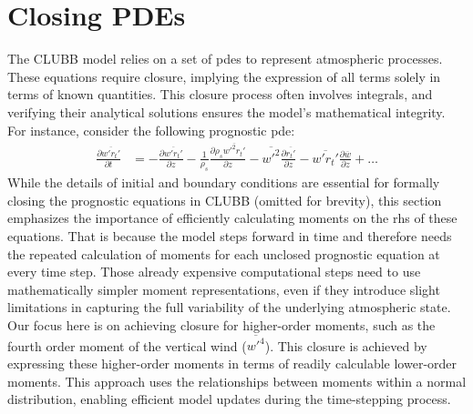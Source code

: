 \section{Closing PDEs}\label{sec:closing_pdes}

The \gls{CLUBB} model relies on a set of \glspl{pde} to represent atmospheric processes.
These equations require closure,
implying the expression of all terms solely in terms of known quantities.
This closure process often involves integrals,
and verifying their analytical solutions ensures the model's mathematical integrity.
For instance, consider the following prognostic {\gls{pde}\autocite[p. 21]{larson2022clubbsilhs}}:
\begin{align*}
    \frac{\partial \overline{w'r_t'}}{\partial t}
    &= -\frac{\partial \overline{w'r_t'}}{\partial z}
    - \frac{1}{\rho_s} \frac{\partial \rho_s \overline{w'^2 r_t'}}{\partial z}
    - \overline{w'^2} \frac{\partial \overline{r_t'}}{\partial z}
    - \overline{w'r_t'} \frac{\partial \overline{w}}{\partial z}
    + \ldots
\end{align*}
While the details of initial and boundary conditions are essential
for formally closing the prognostic equations in \gls{CLUBB} (omitted for brevity),
this section emphasizes the importance of efficiently calculating moments
on the \gls{rhs} of these equations.
That is because the model steps forward in time
and therefore needs the repeated calculation of moments
for each unclosed prognostic equation at every time step.
Those already expensive computational steps need to use mathematically simpler moment representations,
even if they introduce slight limitations
in capturing the full variability of the underlying atmospheric state.
Our focus here is on achieving closure for higher-order moments,
such as the fourth order moment of the vertical wind ($\overline{w'^4}$).
This closure is achieved by expressing these higher-order moments in terms of readily calculable lower-order moments.
This approach uses the relationships between moments within a normal distribution,
enabling efficient model updates during the time-stepping process.